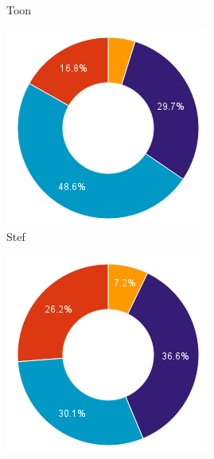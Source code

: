 \documentclass[i3]{oss}
\begin{document}
\begin{figure}[h!]
\begin{subfigure}[hb]{0.20\textwidth}
                \caption{Toon}
        \end{subfigure}%
        \begin{subfigure}[hb]{0.20\textwidth}
                \centering
                \includegraphics[width=\textwidth]{chart_4}
                \caption{Stef}
        \end{subfigure}%
        \begin{subfigure}[hb]{0.20\textwidth}
                \centering
                \includegraphics[width=\textwidth]{chart_5}

\end{subfigure}
\end{figure}
\end{document}
